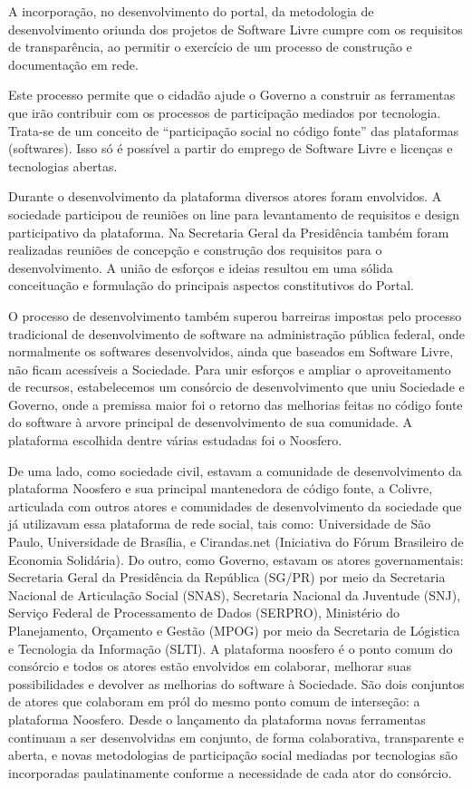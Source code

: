 \documentclass{article}
\begin{document}
A incorporação, no desenvolvimento do portal, da metodologia de desenvolvimento
oriunda dos projetos de Software Livre cumpre com os requisitos de
transparência, ao permitir o exercício de um processo de construção e
documentação em rede. 

Este processo permite que o cidadão ajude o Governo a construir as ferramentas
que irão contribuir com os processos de participação mediados por tecnologia.
Trata-se de um conceito de ``participação social no código fonte'' das
plataformas (softwares). Isso só é possível a partir do emprego de Software
Livre e licenças e tecnologias abertas. 

Durante o desenvolvimento da plataforma diversos atores foram envolvidos. A
sociedade participou de reuniões on line para levantamento de requisitos e
design participativo da plataforma. Na Secretaria Geral da Presidência também
foram realizadas reuniões de concepção e construção dos requisitos para o
desenvolvimento. A união de esforços e ideias resultou em uma sólida
conceituação e formulação do principais aspectos constitutivos do Portal.

O processo de desenvolvimento também superou barreiras impostas pelo processo
tradicional de desenvolvimento de software na administração pública federal,
onde normalmente os softwares desenvolvidos, ainda que baseados em Software
Livre, não ficam acessíveis a Sociedade. Para unir esforços e ampliar o
aproveitamento de recursos, estabelecemos um consórcio de desenvolvimento que
uniu Sociedade e Governo, onde a premissa maior foi o retorno das melhorias
feitas no código fonte do software à arvore principal de desenvolvimento de sua
comunidade. A plataforma escolhida dentre várias estudadas foi o Noosfero.

De uma lado, como sociedade civil, estavam a comunidade de desenvolvimento da
plataforma Noosfero e sua principal mantenedora de código fonte, a Colivre,
articulada com outros atores e comunidades de desenvolvimento da sociedade que
já utilizavam essa plataforma de rede social, tais como: Universidade de São
Paulo, Universidade de Brasília, e Cirandas.net (Iniciativa do Fórum Brasileiro
de Economia Solidária). Do outro, como Governo, estavam os atores
governamentais: Secretaria Geral da Presidência da República (SG/PR) por meio
da Secretaria Nacional de Articulação Social (SNAS), Secretaria Nacional da
Juventude (SNJ), Serviço Federal de Processamento de Dados (SERPRO), Ministério
do Planejamento, Orçamento e Gestão (MPOG) por meio da Secretaria de Lógistica
e Tecnologia da Informação (SLTI). A plataforma noosfero é o ponto comum do
consórcio e todos os atores estão envolvidos em colaborar, melhorar suas
possibilidades e devolver as melhorias do software à Sociedade. São dois
conjuntos de atores que colaboram em pról do mesmo ponto comum de interseção: a
plataforma Noosfero. Desde o lançamento da plataforma novas ferramentas
continuam a ser desenvolvidas em conjunto, de forma colaborativa, transparente
e aberta, e novas metodologias de participação social mediadas por tecnologias
são incorporadas paulatinamente conforme a necessidade de cada ator do
consórcio.
\end{document}
